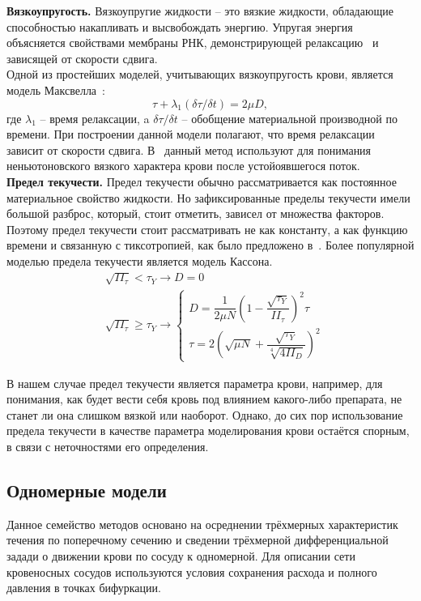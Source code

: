 \textbf{Вязкоупругость.}
Вязкоупругие жидкости -- это вязкие жидкости, обладающие способностью накапливать и высвобождать энергию. 
Упругая энергия объясняется свойствами мембраны РНК, демонстрирующей релаксацию~\cite{evans:1976} и зависящей от скорости сдвига.\\
Одной из простейших моделей, учитывающих вязкоупругость крови, является модель Максвелла~\cite{thurston:1972}:
$$
\tau+\lambda_1(\delta\tau / \delta t)=2\mu D,
$$  
где $\lambda_1$ -- время релаксации, a $\delta\tau / \delta t$ -- обобщение материальной производной по времени.
При построении данной модели полагают, что время релаксации зависит от скорости сдвига.
В~\cite{thurston:1994} данный метод используют для понимания неньютоновского вязкого характера крови после устойоявшегося поток.\\

\textbf{Предел текучести.}
Предел текучести обычно рассматривается как постоянное материальное свойство жидкости. 
Но зафиксированные пределы текучести имели большой разброс, который, стоит отметить, зависел от множества факторов.
Поэтому предел текучести стоит рассматривать не как константу, а как функцию времени и связанную с тиксотропией, 
как было предложено в~\cite{moller:2006}.
Более популярной моделью предела текучести является модель Кассона.
$$
\begin{aligned}
	&\sqrt{II_\tau} < \tau_Y\longrightarrow D=0 \\
	&\sqrt{II_\tau} \geq \tau_Y\longrightarrow
	\begin{cases}
		D   = \dfrac{1}{2\mu N}\left(1-\dfrac{\sqrt{\tau_Y}}{II_\tau}\right)^2\tau \\[10pt]
		\tau= 2\left(\sqrt{\mu N}+\dfrac{\sqrt{\tau_Y}}{\sqrt[4]{4II_D}}\right)^2
	\end{cases}
\end{aligned}
$$

В нашем случае предел текучести является параметра крови, например, для понимания, как будет вести себя кровь под влиянием какого-либо 
препарата, не станет ли она слишком вязкой или наоборот.
Однако, до сих пор использование предела текучести в качестве параметра моделирования крови остаётся спорным, 
в связи с неточностями его определения.

\subsection{Одномерные модели}
Данное семейство методов основано на осреднении трёхмерных характеристик течения по поперечному сечению и сведении
трёхмерной дифференциальной задади о движении крови по сосуду к одномерной.
Для описании сети кровеносных сосудов используются условия сохранения расхода и полного давления в точках бифуркации.

